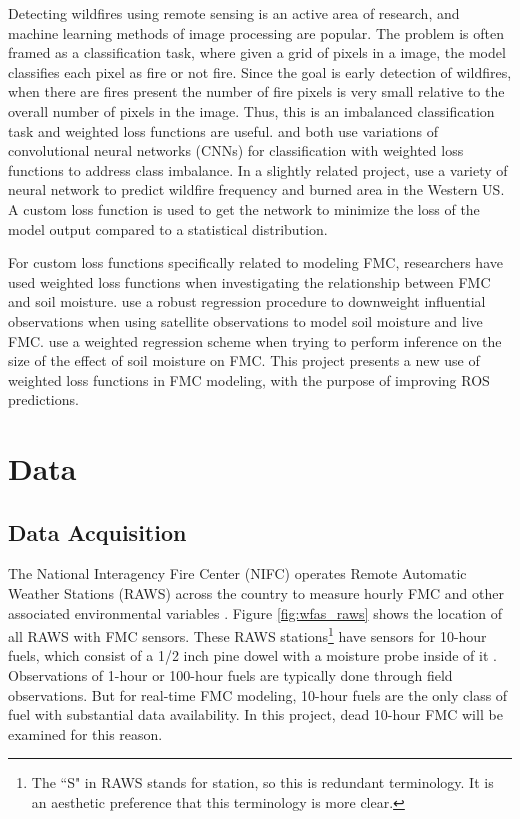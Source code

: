 \documentclass[11pt]{article}%
\begin{document}
Detecting wildfires using remote sensing is an active area of research, and machine learning methods of image processing are popular. The problem is often framed as a classification task, where given a grid of pixels in a image, the model classifies each pixel as fire or not fire. Since the goal is early detection of wildfires, when there are fires present the number of fire pixels is very small relative to the overall number of pixels in the image. Thus, this is an imbalanced classification task and weighted loss functions are useful. \cite{Yang-2021-PFF} and \cite{Pande-2021-WSF} both use variations of convolutional neural networks (CNNs) for classification with weighted loss functions to address class imbalance. In a slightly related project, \cite{Buch-2022-SML} use a variety of neural network to predict wildfire frequency and burned area in the Western US. A custom loss function is used to get the network to minimize the loss of the model output compared to a  statistical distribution.

For custom loss functions specifically related to modeling FMC, researchers have used weighted loss functions when investigating the relationship between FMC and soil moisture. \cite{Lu-2021-EMS} use a robust regression procedure to downweight influential observations when using satellite observations to model soil moisture and live FMC. \cite{Rakhmatulina-2021-SMI} use a weighted regression scheme when trying to perform inference on the size of the effect of soil moisture on FMC. This project presents a new use of weighted loss functions in FMC modeling, with the purpose of improving ROS predictions.


\section{Data}
\label{sec:data}
\subsection{Data Acquisition}

The National Interagency Fire Center (NIFC) operates Remote Automatic Weather Stations (RAWS) across the country to measure hourly FMC and other associated environmental variables \citep{NIFC-2024-RAW}. Figure \ref{fig:wfas_raws} shows the location of all RAWS with FMC sensors. These RAWS stations\footnote{The ``S" in RAWS stands for station, so this is redundant terminology. It is an aesthetic preference that this terminology is more clear.} have sensors for 10-hour fuels, which consist of a 1/2 inch pine dowel with a moisture probe inside of it \citep{Campbell-2017-RMM}. Observations of 1-hour or 100-hour fuels are typically done through field observations. But for real-time FMC modeling, 10-hour fuels are the only class of fuel with substantial data availability. In this project, dead 10-hour FMC will be examined for this reason.
\end{document}
